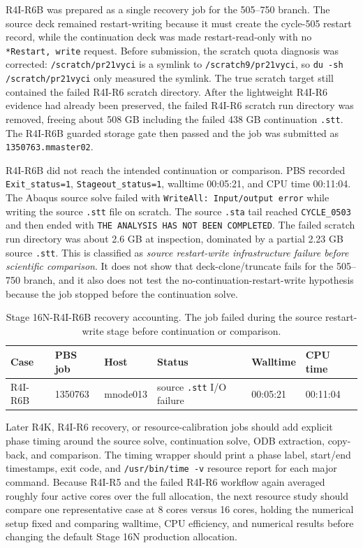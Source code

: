 \documentclass[11pt,a4paper]{article}
\newcommand{\code}[1]{\texttt{#1}}
\begin{document}
R4I-R6B was prepared as a single recovery job for the 505--750 branch. The source deck remained restart-writing because it must create the cycle-505 restart record, while the continuation deck was made restart-read-only with no \code{*Restart, write} request. Before submission, the scratch quota diagnosis was corrected: \code{/scratch/pr21vyci} is a symlink to \code{/scratch9/pr21vyci}, so \code{du -sh /scratch/pr21vyci} only measured the symlink. The true scratch target still contained the failed R4I-R6 scratch directory. After the lightweight R4I-R6 evidence had already been preserved, the failed R4I-R6 scratch run directory was removed, freeing about 508 GB including the failed 438 GB continuation \code{.stt}. The R4I-R6B guarded storage gate then passed and the job was submitted as \code{1350763.mmaster02}.

R4I-R6B did not reach the intended continuation or comparison. PBS recorded \code{Exit\_status=1}, \code{Stageout\_status=1}, walltime 00:05:21, and CPU time 00:11:04. The Abaqus source solve failed with \code{WriteAll: Input/output error} while writing the source \code{.stt} file on scratch. The source \code{.sta} tail reached \code{CYCLE\_0503} and then ended with \code{THE ANALYSIS HAS NOT BEEN COMPLETED}. The failed scratch run directory was about 2.6 GB at inspection, dominated by a partial 2.23 GB source \code{.stt}. This is classified as \emph{source restart-write infrastructure failure before scientific comparison}. It does not show that deck-clone/truncate fails for the 505--750 branch, and it also does not test the no-continuation-restart-write hypothesis because the job stopped before the continuation solve.

\begin{table}[H]
\centering
\small
\begin{tabular}{llllll}
\toprule
Case & PBS job & Host & Status & Walltime & CPU time \\
\midrule
R4I-R6B & 1350763 & mnode013 & source \code{.stt} I/O failure & 00:05:21 & 00:11:04 \\
\bottomrule
\end{tabular}
\caption{Stage 16N-R4I-R6B recovery accounting. The job failed during the source restart-write stage before continuation or comparison.}
\end{table}

Later R4K, R4I-R6 recovery, or resource-calibration jobs should add explicit phase timing around the source solve, continuation solve, ODB extraction, copy-back, and comparison. The timing wrapper should print a phase label, start/end timestamps, exit code, and \code{/usr/bin/time -v} resource report for each major command. Because R4I-R5 and the failed R4I-R6 workflow again averaged roughly four active cores over the full allocation, the next resource study should compare one representative case at 8 cores versus 16 cores, holding the numerical setup fixed and comparing walltime, CPU efficiency, and numerical results before changing the default Stage 16N production allocation.
\end{document}
